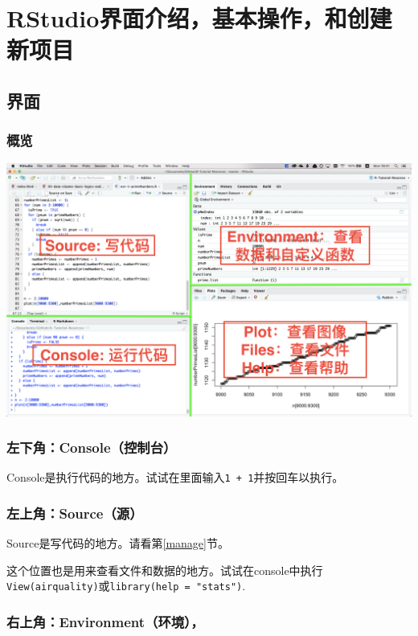 \documentclass[]{book}
\begin{document}
\hypertarget{ch2}{%
\chapter{RStudio界面介绍，基本操作，和创建新项目}\label{ch2}}

\section{界面}

\subsection{概览}

\includegraphics[width=46.67in]{img/01-interface}

\hypertarget{console}{%
\subsection{左下角：Console（控制台）}\label{console}}

Console是执行代码的地方。试试在里面输入\texttt{1\ +\ 1}并按回车以执行。

\hypertarget{source}{%
\subsection{左上角：Source（源）}\label{source}}

Source是写代码的地方。请看第\ref{manage}节。

这个位置也是用来查看文件和数据的地方。试试在console中执行\texttt{View(airquality)}或\texttt{library(help\ =\ "stats")}.

\hypertarget{environment}{%
\subsection{右上角：Environment（环境），}\label{environment}}
\end{document}
